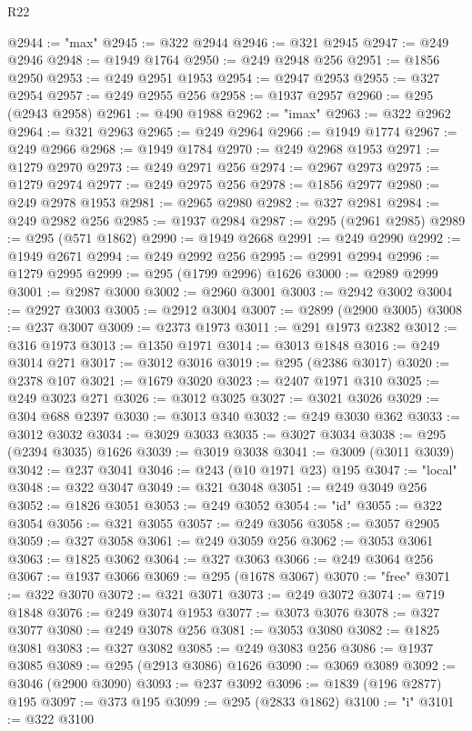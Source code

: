 \begin{lexlean}{R22}
\begin{coremodule}
@2944 := "max"
@2945 := @322 @2944
@2946 := @321 @2945
@2947 := @249 @2946
@2948 := @1949 @1764
@2950 := @249 @2948 @256
@2951 := @1856 @2950
@2953 := @249 @2951 @1953
@2954 := @2947 @2953
@2955 := @327 @2954
@2957 := @249 @2955 @256
@2958 := @1937 @2957
@2960 := @295 (@2943 @2958)
@2961 := @490 @1988
@2962 := "imax"
@2963 := @322 @2962
@2964 := @321 @2963
@2965 := @249 @2964
@2966 := @1949 @1774
@2967 := @249 @2966
@2968 := @1949 @1784
@2970 := @249 @2968 @1953
@2971 := @1279 @2970
@2973 := @249 @2971 @256
@2974 := @2967 @2973
@2975 := @1279 @2974
@2977 := @249 @2975 @256
@2978 := @1856 @2977
@2980 := @249 @2978 @1953
@2981 := @2965 @2980
@2982 := @327 @2981
@2984 := @249 @2982 @256
@2985 := @1937 @2984
@2987 := @295 (@2961 @2985)
@2989 := @295 (@571 @1862)
@2990 := @1949 @2668
@2991 := @249 @2990
@2992 := @1949 @2671
@2994 := @249 @2992 @256
@2995 := @2991 @2994
@2996 := @1279 @2995
@2999 := @295 (@1799 @2996) @1626
@3000 := @2989 @2999
@3001 := @2987 @3000
@3002 := @2960 @3001
@3003 := @2942 @3002
@3004 := @2927 @3003
@3005 := @2912 @3004
@3007 := @2899 (@2900 @3005)
@3008 := @237 @3007
@3009 := @2373 @1973
@3011 := @291 @1973 @2382
@3012 := @316 @1973
@3013 := @1350 @1971
@3014 := @3013 @1848
@3016 := @249 @3014 @271
@3017 := @3012 @3016
@3019 := @295 (@2386 @3017)
@3020 := @2378 @107
@3021 := @1679 @3020
@3023 := @2407 @1971 @310
@3025 := @249 @3023 @271
@3026 := @3012 @3025
@3027 := @3021 @3026
@3029 := @304 @688 @2397
@3030 := @3013 @340
@3032 := @249 @3030 @362
@3033 := @3012 @3032
@3034 := @3029 @3033
@3035 := @3027 @3034
@3038 := @295 (@2394 @3035) @1626
@3039 := @3019 @3038
@3041 := @3009 (@3011 @3039)
@3042 := @237 @3041
@3046 := @243 (@10 @1971 @23) @195
@3047 := "local"
@3048 := @322 @3047
@3049 := @321 @3048
@3051 := @249 @3049 @256
@3052 := @1826 @3051
@3053 := @249 @3052
@3054 := "id"
@3055 := @322 @3054
@3056 := @321 @3055
@3057 := @249 @3056
@3058 := @3057 @2905
@3059 := @327 @3058
@3061 := @249 @3059 @256
@3062 := @3053 @3061
@3063 := @1825 @3062
@3064 := @327 @3063
@3066 := @249 @3064 @256
@3067 := @1937 @3066
@3069 := @295 (@1678 @3067)
@3070 := "free"
@3071 := @322 @3070
@3072 := @321 @3071
@3073 := @249 @3072
@3074 := @719 @1848
@3076 := @249 @3074 @1953
@3077 := @3073 @3076
@3078 := @327 @3077
@3080 := @249 @3078 @256
@3081 := @3053 @3080
@3082 := @1825 @3081
@3083 := @327 @3082
@3085 := @249 @3083 @256
@3086 := @1937 @3085
@3089 := @295 (@2913 @3086) @1626
@3090 := @3069 @3089
@3092 := @3046 (@2900 @3090)
@3093 := @237 @3092
@3096 := @1839 (@196 @2877) @195
@3097 := @373 @195
@3099 := @295 (@2833 @1862)
@3100 := "i"
@3101 := @322 @3100

\end{coremodule}
\end{lexlean}
